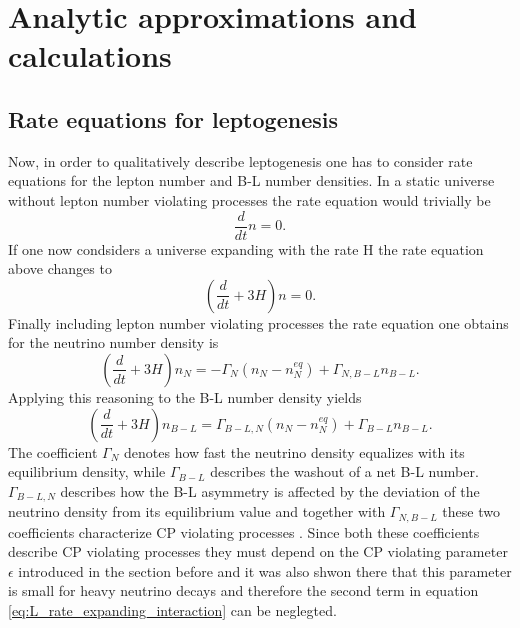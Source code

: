  \chapter{Analytic approximations and calculations}
 
\section{Rate equations for leptogenesis}
Now, in order to qualitatively describe leptogenesis one has to consider rate equations for the lepton number and B-L number densities. In a static universe without lepton number violating processes the rate equation would trivially be
\begin{equation}
	\frac{d}{dt}n=0.
	\label{eq:rate_static_nointeraction}
\end{equation}
If one now condsiders a universe expanding with the rate H the rate equation above changes to
\begin{equation}
\left(\frac{d}{dt}+3H\right)n=0.
\label{eq:rate_expanding_nointeraction}
\end{equation}
Finally including lepton number violating processes the rate equation one obtains for the neutrino number density is
\begin{equation}
\left(\frac{d}{dt}+3H\right)n_N=-\Gamma_N\left(n_N-n_N^{eq}\right)+\Gamma_{N,B-L}n_{B-L}.
\label{eq:L_rate_expanding_interaction}
\end{equation}
Applying this reasoning to the B-L number density yields
\begin{equation}
\left(\frac{d}{dt}+3H\right)n_{B-L}=\Gamma_{B-L,N}\left(n_N-n_N^{eq}\right)+\Gamma_{B-L}n_{B-L}.
\label{eq:B-L_rate_expanding_interaction}
\end{equation}
The coefficient $\Gamma_N$ denotes how fast the neutrino density equalizes with its equilibrium density, while $\Gamma_{B-L}$ describes the washout of a net B-L number. $\Gamma_{B-L,N}$ describes how the B-L asymmetry is affected by the deviation of the neutrino density from its equilibrium value and together with $\Gamma_{N,B-L}$ these two coefficients characterize CP violating processes \cite[p. 4]{Bodeker:2013qaa}. Since both these coefficients describe CP violating processes they must depend on the CP violating parameter $\epsilon$ introduced in the section before and it was also shwon there that this parameter is small for heavy neutrino decays and therefore the second term in equation \eqref{eq:L_rate_expanding_interaction} can be neglegted. \newline
